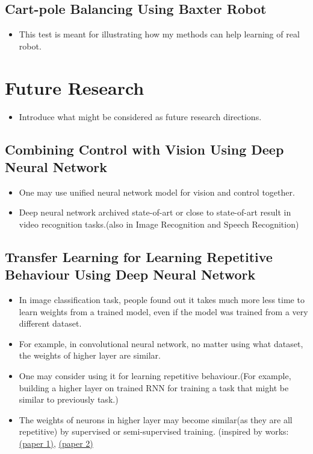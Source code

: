 \documentclass[officiallayout]{tktla}
\begin{document}
\section{Cart-pole Balancing Using Baxter Robot}
\begin{itemize}
\item This test is meant for illustrating how my methods can help learning of real robot.
\end{itemize}

\chapter{Future Research}
\begin{itemize}
\item Introduce what might be considered as future research directions.
\end{itemize}
\section{Combining Control with Vision Using Deep Neural Network}
\begin{itemize}
\item One may use unified neural network model for vision and control together.
\item Deep neural network archived state-of-art or close to state-of-art result in video recognition tasks.(also in Image Recognition and Speech Recognition)
\end{itemize}
\section{Transfer Learning for Learning Repetitive Behaviour Using Deep Neural Network}
\begin{itemize}
\item In image classification task, people found out it takes much more less time to learn weights from a trained model, even if the model was trained from a very different dataset.
\item For example, in convolutional neural network, no matter using what dataset, the weights of higher layer are similar.
\item One may consider using it for learning repetitive behaviour.(For example, building a higher layer on trained RNN for training a task that might be similar to previously task.)
\item The weights of neurons in higher layer may become similar(as they are all repetitive) by supervised or semi-supervised training. (inspired by works: \href{http://arxiv.org/pdf/1406.5298.pdf}{(paper 1)}, \href{http://arxiv.org/pdf/1411.4555.pdf}{(paper 2)}
\end{itemize}




\end{document}
